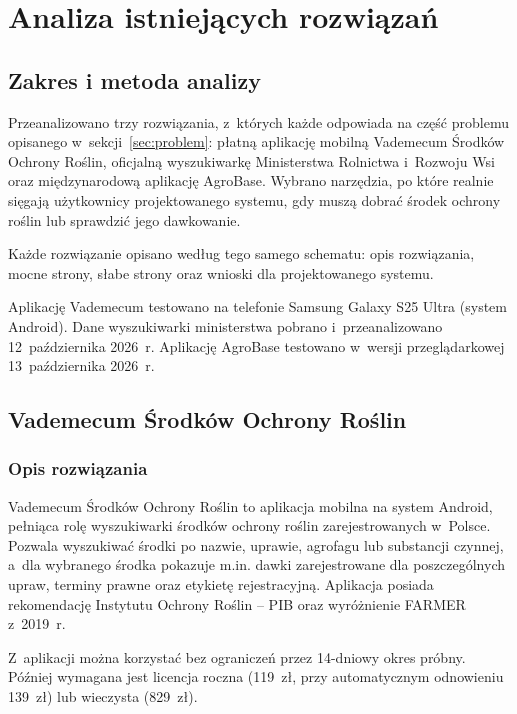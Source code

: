 \section{Analiza istniejących rozwiązań}
\label{sec:analiza}

\subsection{Zakres i metoda analizy}

Przeanalizowano trzy rozwiązania, z~których każde odpowiada na część problemu
opisanego w~sekcji~\ref{sec:problem}: płatną aplikację mobilną Vademecum
Środków Ochrony Roślin, oficjalną wyszukiwarkę Ministerstwa Rolnictwa
i~Rozwoju Wsi oraz międzynarodową aplikację AgroBase.
Wybrano narzędzia, po które realnie sięgają
użytkownicy projektowanego systemu, gdy muszą dobrać środek ochrony roślin
lub sprawdzić jego dawkowanie.

Każde rozwiązanie opisano według tego samego schematu: opis rozwiązania,
mocne strony, słabe strony oraz wnioski dla projektowanego systemu.

Aplikację Vademecum testowano na telefonie Samsung Galaxy S25 Ultra
(system Android). Dane wyszukiwarki ministerstwa
pobrano i~przeanalizowano 12~października 2026~r. Aplikację AgroBase
testowano w~wersji przeglądarkowej 13~października 2026~r.

\subsection{Vademecum Środków Ochrony Roślin}

\subsubsection{Opis rozwiązania}

Vademecum Środków Ochrony Roślin to aplikacja mobilna na system Android,
pełniąca rolę wyszukiwarki środków ochrony roślin zarejestrowanych w~Polsce.
Pozwala wyszukiwać środki po nazwie, uprawie, agrofagu lub substancji
czynnej, a~dla wybranego środka pokazuje m.in. dawki zarejestrowane dla
poszczególnych upraw, terminy prawne oraz etykietę rejestracyjną. Aplikacja
posiada rekomendację Instytutu Ochrony Roślin -- PIB oraz wyróżnienie FARMER
z~2019~r.

Z~aplikacji można korzystać bez ograniczeń przez 14-dniowy okres próbny.
Później wymagana jest licencja roczna (119~zł, przy automatycznym
odnowieniu 139~zł) lub wieczysta (829~zł).

